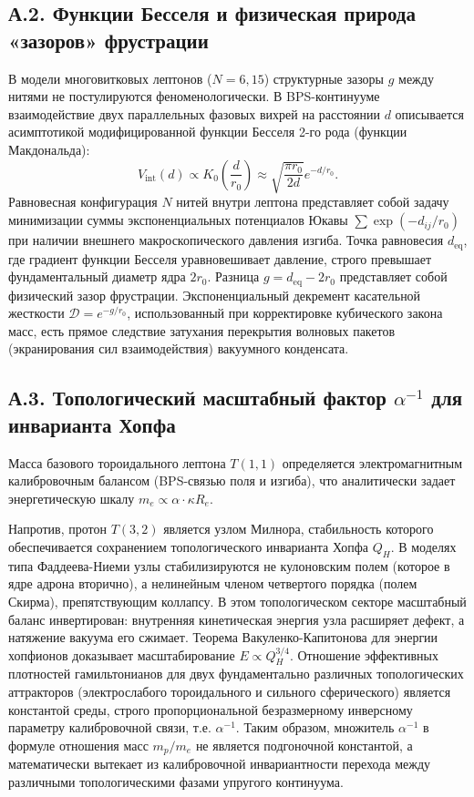 \documentclass[12pt,a4paper]{article}
\begin{document}
\subsection*{А.2. Функции Бесселя и физическая природа «зазоров» фрустрации}
В модели многовитковых лептонов ($N=6, 15$) структурные зазоры $g$ между нитями не постулируются феноменологически. В BPS-континууме взаимодействие двух параллельных фазовых вихрей на расстоянии $d$ описывается асимптотикой модифицированной функции Бесселя 2-го рода (функции Макдональда):
\begin{equation}
V_{\text{int}}(d) \propto K_0\left(\frac{d}{r_0}\right) \approx \sqrt{\frac{\pi r_0}{2d}} e^{-d/r_0}.
\end{equation}
Равновесная конфигурация $N$ нитей внутри лептона представляет собой задачу минимизации суммы экспоненциальных потенциалов Юкавы $\sum \exp(-d_{ij}/r_0)$ при наличии внешнего макроскопического давления изгиба. Точка равновесия $d_{\text{eq}}$, где градиент функции Бесселя уравновешивает давление, строго превышает фундаментальный диаметр ядра $2r_0$. 
Разница $g = d_{\text{eq}} - 2r_0$ представляет собой физический зазор фрустрации. Экспоненциальный декремент касательной жесткости $\mathcal{D} = e^{-g/r_0}$, использованный при корректировке кубического закона масс, есть прямое следствие затухания перекрытия волновых пакетов (экранирования сил взаимодействия) вакуумного конденсата.

\subsection*{А.3. Топологический масштабный фактор $\alpha^{-1}$ для инварианта Хопфа}
Масса базового тороидального лептона $T(1,1)$ определяется электромагнитным калибровочным балансом (BPS-связью поля и изгиба), что аналитически задает энергетическую шкалу $m_e \propto \alpha \cdot \kappa R_e$.

Напротив, протон $T(3,2)$ является узлом Милнора, стабильность которого обеспечивается сохранением топологического инварианта Хопфа $Q_H$. В моделях типа Фаддеева-Ниеми узлы стабилизируются не кулоновским полем (которое в ядре адрона вторично), а нелинейным членом четвертого порядка (полем Скирма), препятствующим коллапсу. 
В этом топологическом секторе масштабный баланс инвертирован: внутренняя кинетическая энергия узла расширяет дефект, а натяжение вакуума его сжимает. Теорема Вакуленко-Капитонова для энергии хопфионов доказывает масштабирование $E \propto Q_H^{3/4}$. Отношение эффективных плотностей гамильтонианов для двух фундаментально различных топологических аттракторов (электрослабого тороидального и сильного сферического) является константой среды, строго пропорциональной безразмерному инверсному параметру калибровочной связи, т.е. $\alpha^{-1}$.
Таким образом, множитель $\alpha^{-1}$ в формуле отношения масс $m_p/m_e$ не является подгоночной константой, а математически вытекает из калибровочной инвариантности перехода между различными топологическими фазами упругого континуума.
\end{document}
